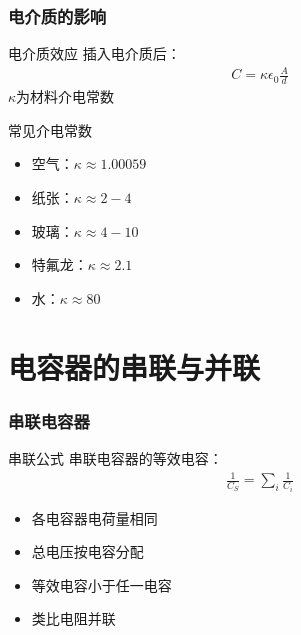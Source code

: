 \documentclass{beamer}
\begin{document}
\begin{frame}
    \frametitle{电介质的影响}
    
    \begin{block}{电介质效应}
        插入电介质后：
        \begin{align}
            C = \kappa\epsilon_0 \frac{A}{d}
        \end{align}
        $\kappa$为材料介电常数
    \end{block}
    
    \begin{block}{常见介电常数}
        \begin{itemize}
            \item 空气：$\kappa \approx 1.00059$
            \item 纸张：$\kappa \approx 2-4$
            \item 玻璃：$\kappa \approx 4-10$
            \item 特氟龙：$\kappa \approx 2.1$
            \item 水：$\kappa \approx 80$
        \end{itemize}
    \end{block}
\end{frame}

\section{电容器的串联与并联}

\begin{frame}
    \frametitle{串联电容器}
    
    \begin{block}{串联公式}
        串联电容器的等效电容：
        \begin{align}
            \frac{1}{C_S} = \sum_i \frac{1}{C_i}
        \end{align}
    \end{block}
    
    \begin{itemize}
        \item 各电容器电荷量相同
        \item 总电压按电容分配
        \item 等效电容小于任一电容
        \item 类比电阻并联
    \end{itemize}
\end{frame}
\end{document}
